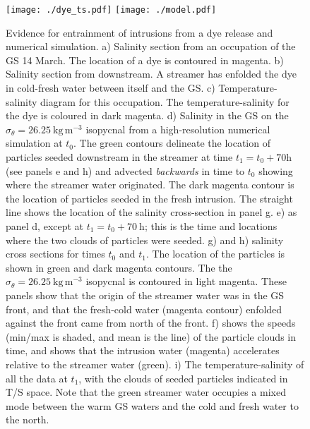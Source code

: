 \documentclass[draft,grl]{agutex2015}
\begin{document}
\begin{article}
\begin{figure}[htbp]
  \centering
    \texttt{[image: ./dye\_ts.pdf]}
    \texttt{[image: ./model.pdf]}
  \caption{Evidence for entrainment of intrusions from a dye release and numerical simulation.
a) Salinity section from an occupation of the GS 14 March. The location of a dye is contoured in magenta.  b) Salinity section from downstream.  A streamer has enfolded the dye in cold-fresh water between itself and the GS.  c) Temperature-salinity diagram for this occupation.  The temperature-salinity for the dye is coloured in dark magenta.  
d) Salinity in the GS on the $\sigma_{\theta}=26.25\  \mathrm{kg\,m^{-3}}$ isopycnal from a high-resolution numerical simulation at $t_0$.  The green contours delineate the location of particles seeded downstream in the streamer at time $t_1=t_0+70 \mathrm{h}$ (see panels e and h) and advected \emph{backwards} in time to $t_0$ showing where the streamer water originated. The dark magenta contour is the location of particles seeded in the fresh intrusion.  The straight line shows the location of the salinity cross-section in panel g.  e) as panel d, except at $t_1=t_0+70\ \mathrm{h}$; this is the time and locations where the two clouds of particles were seeded.  g) and h) salinity cross sections for times $t_0$ and $t_1$.  The location of the particles is shown in green and dark magenta contours.  The the $\sigma_{\theta}=26.25\  \mathrm{kg\,m^{-3}}$ isopycnal is contoured in light magenta.  These panels show that the origin of the streamer water was in the GS front, and that the fresh-cold water (magenta contour) enfolded against the front came from north of the front.  f) shows the speeds (min/max is shaded, and mean is the line) of the particle clouds in time, and shows that the intrusion water (magenta) accelerates relative to the streamer water (green).  i) The temperature-salinity of all the data at $t_1$, with the clouds of seeded particles indicated in T/S space.  Note that the green streamer water occupies a  mixed mode between the warm GS waters and the cold and fresh water to the north.  
  } \label{fig:StreamersModel}
\end{figure}





\end{article}
\end{document}
